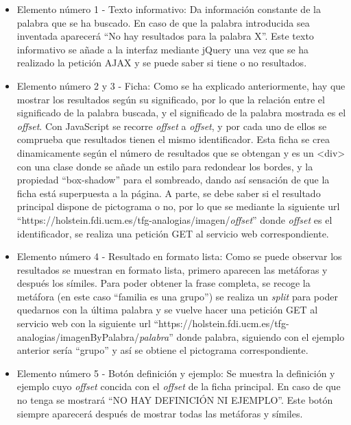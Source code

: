 \begin{itemize}
	\item Elemento número 1 - Texto informativo: Da información constante de la palabra que se ha buscado. En caso de que la palabra introducida sea inventada aparecerá ``No hay resultados para la palabra X''. Este texto informativo se añade a la interfaz mediante jQuery una vez que se ha realizado la petición AJAX y se puede saber si tiene o no resultados.
	
	\item Elemento número 2 y 3 - Ficha: Como se ha explicado anteriormente, hay que mostrar los resultados según su significado, por lo que la relación entre el significado de la palabra buscada, y el significado de la palabra mostrada es el \textit{offset}. Con JavaScript se recorre \textit{offset} a \textit{offset}, y por cada uno de ellos se comprueba que resultados tienen el mismo identificador. Esta ficha se crea dinamicamente según el número de resultados que se obtengan y es un <div> con una clase donde se añade un estilo para redondear los bordes, y la propiedad ``box-shadow'' para el sombreado, dando así sensación de que la ficha está superpuesta a la página. A parte, se debe saber si el resultado principal dispone de pictograma o no, por lo que se mediante la siguiente url ``https://holstein.fdi.ucm.es/tfg-analogias/imagen/\textit{offset}'' donde \textit{offset} es el identificador, se realiza una petición GET al servicio web correspondiente.
	
	\item Elemento número 4 - Resultado en formato lista: Como se puede observar los resultados se muestran en formato lista, primero aparecen las metáforas y después los símiles. Para poder obtener la frase completa, se recoge la metáfora (en este caso ``familia es una grupo'') se realiza un \textit{split} para poder quedarnos con la última palabra y se vuelve hacer una petición GET al servicio web con la siguiente url ``https://holstein.fdi.ucm.es/tfg-analogias/imagenByPalabra/\textit{palabra}'' donde palabra, siguiendo con el ejemplo anterior sería ``grupo'' y así se obtiene el pictograma correspondiente.
	
	\item Elemento número 5 - Botón definición y ejemplo: Se muestra la definición y ejemplo cuyo \textit{offset} concida con el \textit{offset} de la ficha principal. En caso de que no tenga se mostrará ``NO HAY DEFINICIÓN NI EJEMPLO''. Este botón siempre aparecerá después de mostrar todas las metáforas y símiles.
 
\end{itemize}


